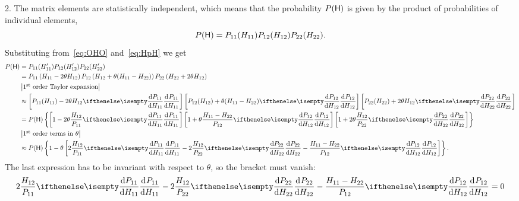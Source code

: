 \documentclass[a4paper,11pt,twoside]{article}
\begin{document}
            2. The matrix elements are statistically independent, which means that the probability $P(\mathsf{H})$ is given by the product of probabilities of individual elements, 
            \begin{equation}
                P(\mathsf{H})
                    =P_{11}(H_{11})P_{12}(H_{12})P_{22}(H_{22}).
            \end{equation}
            Substituting from~\eqref{eq:OHO} and~\eqref{eq:HpH} we get 
            \begin{align}
                P(\matrix{H})
                    &=P_{11}(H'_{11})P_{12}(H'_{12})P_{22}(H'_{22})\nonumber\\
                    &=P_{11}\left(H_{11}-2\theta H_{12}\right)
                        P_{12}\left(H_{12}+\theta(H_{11}-H_{22})\right)
                        P_{22}\left(H_{22}+2\theta H_{12}\right)\nonumber\\
                    &\equationcomment{\text{$1^{\text{st}}$ order Taylor expansion}}\nonumber\\
                    &\approx \left[P_{11}(H_{11})-2\theta H_{12}\derivative{P_{11}}{H_{11}}\right]
                        \left[P_{12}(H_{12})+\theta(H_{11}-H_{22})\derivative{P_{12}}{H_{12}}\right]
                        \left[P_{22}(H_{22})+2\theta H_{12}\derivative{P_{22}}{H_{22}}\right]\nonumber\\
                    &=P(\matrix{H})\left\{
                        \left[1-2\theta\frac{H_{12}}{P_{11}}\derivative{P_{11}}{H_{11}}\right]
                        \left[1+\theta\frac{H_{11}-H_{22}}{P_{12}}\derivative{P_{12}}{H_{12}}\right]
                        \left[1+2\theta\frac{H_{12}}{P_{22}}\derivative{P_{22}}{H_{22}}\right]
                        \right\}\nonumber\\
                    &\equationcomment{\text{$1^{\text{st}}$ order terms in $\theta$}}\nonumber\\
                    &\approx P(\matrix{H})\left\{1-\theta\left[
                        2\frac{H_{12}}{P_{11}}\derivative{P_{11}}{H_{11}}
                        -2\frac{H_{12}}{P_{22}}\derivative{P_{22}}{H_{22}}
                        -\frac{H_{11}-H_{22}}{P_{12}}\derivative{P_{12}}{H_{12}}
                        \right]\right\}.
            \end{align}
            The last expression has to be invariant with respect to $\theta$, so the bracket must vanish:
            \begin{equation}
                2\frac{H_{12}}{P_{11}}\derivative{P_{11}}{H_{11}}
                -2\frac{H_{12}}{P_{22}}\derivative{P_{22}}{H_{22}}
                -\frac{H_{11}-H_{22}}{P_{12}}\derivative{P_{12}}{H_{12}}=0
            \end{equation}
\end{document}
